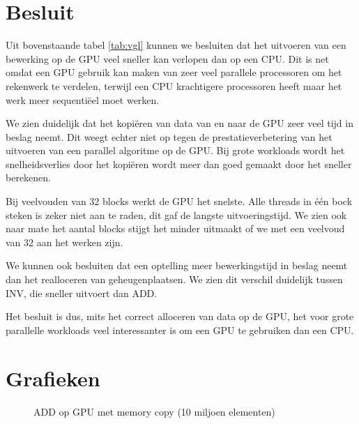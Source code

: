 \documentclass[twoside,a4paper]{article}
\begin{document}
\newpage
\section{Besluit}

Uit bovenstaande tabel \ref{tab:vgl} kunnen we besluiten dat het uitvoeren van een bewerking op de GPU veel sneller kan verlopen dan op een CPU. Dit is net omdat een GPU gebruik kan maken van zeer veel parallele processoren om het rekenwerk te verdelen, terwijl een CPU krachtigere processoren heeft maar het werk meer sequenti\"eel moet werken.

We zien duidelijk dat het kopi\"eren van data van en naar de GPU zeer veel tijd in beslag neemt. Dit weegt echter niet op tegen de prestatieverbetering van het uitvoeren van een parallel algoritme op de GPU. Bij grote workloads wordt het snelheidsverlies door het kopi\"eren wordt meer dan goed gemaakt door het sneller berekenen.

Bij veelvouden van 32 blocks werkt de GPU het snelste. Alle threads in \'e\'en bock steken is zeker niet aan te raden, dit gaf de langste uitvoeringstijd. We zien ook naar mate het aantal blocks stijgt het minder uitmaakt of we met een veelvoud van 32 aan het werken zijn.

We kunnen ook besluiten dat een optelling meer bewerkingstijd in beslag neemt dan het realloceren van geheugenplaatsen. We zien dit verschil duidelijk tussen INV, die sneller uitvoert dan ADD.

Het besluit is dus, mits het correct alloceren van data op de GPU, het voor grote parallelle workloads veel interessanter is om een GPU te gebruiken dan een CPU.



\newpage
\appendix
\section{Grafieken}
\label{grafieken}

\begin{figure}[H]
    \centering
    
    \caption{ADD op GPU met memory copy (10 miljoen elementen)}
    \label{fig:ADD_gpu_with_memcopy_10mil_goed}
\end{figure}
\end{document}

